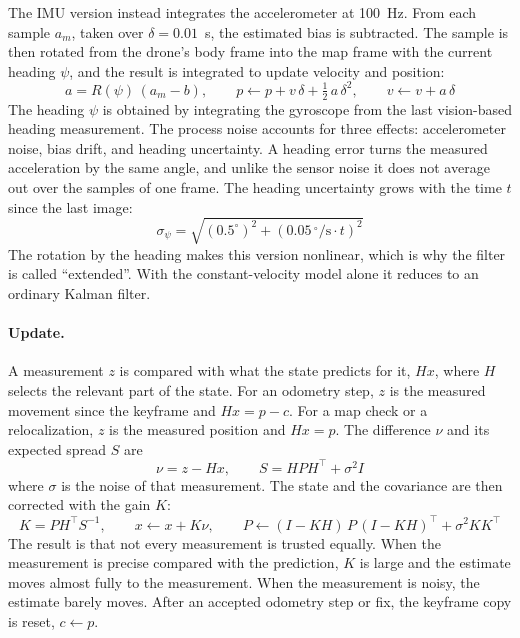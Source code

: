 \documentclass[english, Lau, oneside]{sapthesis}%
\begin{document}
The IMU version instead integrates the accelerometer at 100~Hz. From each sample $a_m$, taken over $\delta = 0.01$~s, the estimated bias is subtracted. The sample is then rotated from the drone's body frame into the map frame with the current heading $\psi$, and the result is integrated to update velocity and position:
\begin{equation}
  a = R(\psi)\,(a_m - b), \qquad p \leftarrow p + v\,\delta + \tfrac{1}{2}\,a\,\delta^2, \qquad v \leftarrow v + a\,\delta
  \label{eq:ekf-imu}
\end{equation}
The heading $\psi$ is obtained by integrating the gyroscope from the last vision-based heading measurement. The process noise accounts for three effects: accelerometer noise, bias drift, and heading uncertainty. A heading error turns the measured acceleration by the same angle, and unlike the sensor noise it does not average out over the samples of one frame. The heading uncertainty grows with the time $t$ since the last image:
\begin{equation}
  \sigma_{\psi} = \sqrt{(0.5^{\circ})^2 + (0.05\,^{\circ}/\mathrm{s} \cdot t)^2}
  \label{eq:ekf-heading}
\end{equation}
The rotation by the heading makes this version nonlinear, which is why the filter is called ``extended''. With the constant-velocity model alone it reduces to an ordinary Kalman filter.

\paragraph{Update.}
A measurement $z$ is compared with what the state predicts for it, $Hx$, where $H$ selects the relevant part of the state. For an odometry step, $z$ is the measured movement since the keyframe and $Hx = p - c$. For a map check or a relocalization, $z$ is the measured position and $Hx = p$. The difference $\nu$ and its expected spread $S$ are
\begin{equation}
  \nu = z - H x, \qquad S = H P H^{\top} + \sigma^2 I
  \label{eq:ekf-innovation}
\end{equation}
where $\sigma$ is the noise of that measurement. The state and the covariance are then corrected with the gain $K$:
\begin{equation}
  K = P H^{\top} S^{-1}, \qquad x \leftarrow x + K\nu, \qquad P \leftarrow (I - KH)\,P\,(I - KH)^{\top} + \sigma^2 K K^{\top}
  \label{eq:ekf-update}
\end{equation}
The result is that not every measurement is trusted equally. When the measurement is precise compared with the prediction, $K$ is large and the estimate moves almost fully to the measurement. When the measurement is noisy, the estimate barely moves. After an accepted odometry step or fix, the keyframe copy is reset, $c \leftarrow p$.
\end{document}
